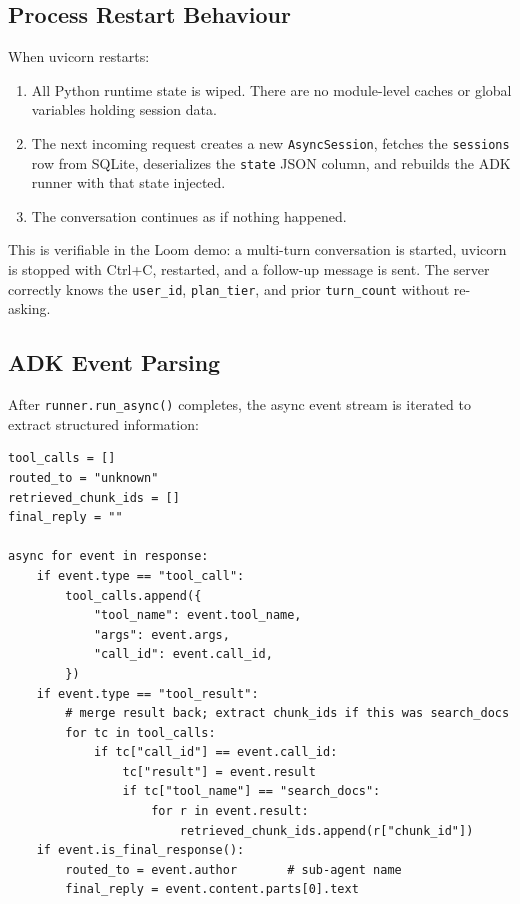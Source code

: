 \documentclass[12pt,a4paper]{article}
\begin{document}
\subsection{Process Restart Behaviour}

When uvicorn restarts:

\begin{enumerate}[leftmargin=1.5em]
  \item All Python runtime state is wiped. There are no module-level caches or global variables holding session data.
  \item The next incoming request creates a new \texttt{AsyncSession}, fetches the \texttt{sessions} row from SQLite, deserializes the \texttt{state} JSON column, and rebuilds the ADK runner with that state injected.
  \item The conversation continues as if nothing happened.
\end{enumerate}

This is verifiable in the Loom demo: a multi-turn conversation is started, uvicorn is stopped with Ctrl+C, restarted, and a follow-up message is sent. The server correctly knows the \texttt{user\_id}, \texttt{plan\_tier}, and prior \texttt{turn\_count} without re-asking.

\subsection{ADK Event Parsing}

After \texttt{runner.run\_async()} completes, the async event stream is iterated to extract structured information:

\begin{lstlisting}[style=python]
tool_calls = []
routed_to = "unknown"
retrieved_chunk_ids = []
final_reply = ""

async for event in response:
    if event.type == "tool_call":
        tool_calls.append({
            "tool_name": event.tool_name,
            "args": event.args,
            "call_id": event.call_id,
        })
    if event.type == "tool_result":
        # merge result back; extract chunk_ids if this was search_docs
        for tc in tool_calls:
            if tc["call_id"] == event.call_id:
                tc["result"] = event.result
                if tc["tool_name"] == "search_docs":
                    for r in event.result:
                        retrieved_chunk_ids.append(r["chunk_id"])
    if event.is_final_response():
        routed_to = event.author       # sub-agent name
        final_reply = event.content.parts[0].text
\end{lstlisting}
\end{document}
